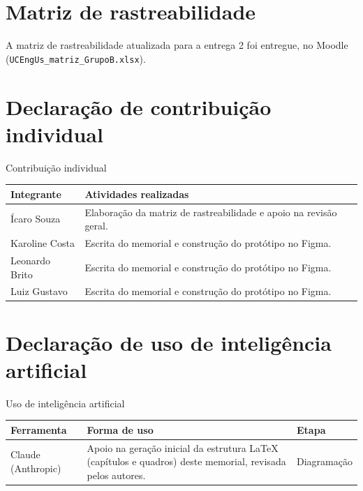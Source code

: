 \documentclass[
  12pt,
  oneside,
  a4paper,
  chapter=TITLE,
  section=TITLE,
  english,
  brazilian
]{abntex2}
\renewcommand{\fonte}[1]{\par\vspace{3pt}{\footnotesize\raggedright\noindent Fonte: #1\par}\vspace{4pt}}%
\newcommand{\autores}{Elaborado pelos autores (2026).}
\begin{document}
\chapter{Matriz de rastreabilidade}\label{cap:matriz}

A matriz de rastreabilidade atualizada para a entrega 2 foi entregue, no Moodle (\texttt{UCEngUs\_\allowbreak matriz\_\allowbreak GrupoB.xlsx}).

\chapter{Declaração de contribuição individual}\label{cap:contribuicao}

\begin{quadro}[!htbp]
  \caption{Contribuição individual}\label{qua:contribuicao}
  \centering\small
  \begin{tabularx}{\textwidth}{|P{4.2cm}|Y|}\hline
    Integrante & Atividades realizadas \\\hline
    Ícaro Souza & Elaboração da matriz de rastreabilidade e apoio na revisão geral. \\\hline
    Karoline Costa & Escrita do memorial e construção do protótipo no Figma. \\\hline
    Leonardo Brito & Escrita do memorial e construção do protótipo no Figma. \\\hline
    Luiz Gustavo & Escrita do memorial e construção do protótipo no Figma. \\\hline
  \end{tabularx}
  \fonte{\autores}
\end{quadro}\FloatBarrier

\chapter{Declaração de uso de inteligência artificial}\label{cap:ia}

\begin{quadro}[!htbp]
  \caption{Uso de inteligência artificial}\label{qua:ia}
  \centering\small
  \begin{tabularx}{\textwidth}{|P{3.6cm}|Y|P{2.8cm}|}\hline
    Ferramenta & Forma de uso & Etapa \\\hline
    Claude (Anthropic) & Apoio na geração inicial da estrutura \LaTeX{} (capítulos e quadros) deste memorial, revisada pelos autores. & Diagramação \\\hline
  \end{tabularx}
\end{quadro}\FloatBarrier
\end{document}
